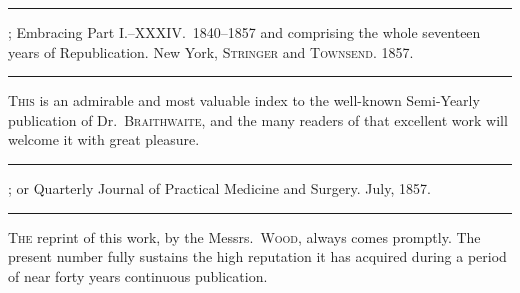\fancybreak{* * *}
\footnotesize
{}; Embracing Part I.--XXXIV.\ 1840--1857
and comprising the whole seventeen years of Republication. New York, \textsc{Stringer} and
\textsc{Townsend}. 1857.
\plainbreak{1}
\normalsize

\lettrine[lines=1]{}{This} is an admirable and most valuable index to the well-known
Semi-Yearly publication of Dr.\ \textsc{Braithwaite}, and the many readers of
that excellent work will welcome it with great pleasure.

\fancybreak{* * *}
\footnotesize
{}; or Quarterly Journal of Practical
Medicine and Surgery. July, 1857.
\plainbreak{1}
\normalsize

\lettrine[lines=1]{}{The} reprint of this work, by the Messrs.\ \textsc{Wood}, always comes
promptly. The present number fully sustains the high reputation it
has acquired during a period of near forty years continuous publication.\endinput
